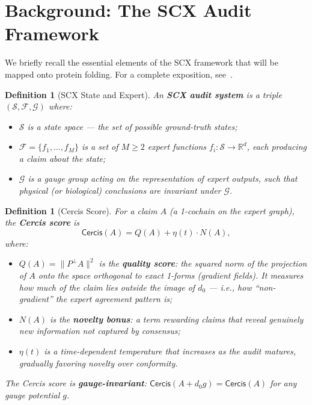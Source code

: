 \documentclass[12pt,a4paper]{article}
\newtheorem{definition}[theorem]{Definition}
\theoremstyle{remark}
\newcommand{\R}{\mathbb{R}}
\newcommand{\G}{\mathcal{G}}
\newcommand{\F}{\mathcal{F}}
\newcommand{\Sstruct}{\mathcal{S}}
\newcommand{\Cercis}{\textsf{Cercis}}
\begin{document}
\section{Background: The SCX Audit Framework}
\label{sec:background}

We briefly recall the essential elements of the SCX framework that will be mapped onto protein folding.
For a complete exposition, see~\cite{scxframework}.

\begin{definition}[SCX State and Expert]
\label{def:scx-basics}
An \textbf{SCX audit system} is a triple $(\Sstruct, \F, \G)$ where:
\begin{itemize}[leftmargin=*]
    \item $\Sstruct$ is a state space — the set of possible ground-truth states;
    \item $\F = \{f_1, \dots, f_M\}$ is a set of $M \geq 2$ expert functions $f_i: \Sstruct \to \R^d$, each producing a claim about the state;
    \item $\G$ is a gauge group acting on the representation of expert outputs, such that physical (or biological) conclusions are invariant under $\G$.
\end{itemize}
\end{definition}

\begin{definition}[Cercis Score]
\label{def:cercis}
For a claim $A$ (a 1-cochain on the expert graph), the \textbf{Cercis score} is
\begin{equation}
    \Cercis(A) = Q(A) + \eta(t) \cdot N(A),
\end{equation}
where:
\begin{itemize}[leftmargin=*]
    \item $Q(A) = \|P^\perp A\|^2$ is the \textbf{quality score}: the squared norm of the projection of $A$ onto the space orthogonal to exact 1-forms (gradient fields). It measures how much of the claim lies outside the image of $d_0$ — i.e., how ``non-gradient'' the expert agreement pattern is;
    \item $N(A)$ is the \textbf{novelty bonus}: a term rewarding claims that reveal genuinely new information not captured by consensus;
    \item $\eta(t)$ is a time-dependent temperature that increases as the audit matures, gradually favoring novelty over conformity.
\end{itemize}
The Cercis score is \textbf{gauge-invariant}: $\Cercis(A + d_0 g) = \Cercis(A)$ for any gauge potential $g$.
\end{definition}
\end{document}
